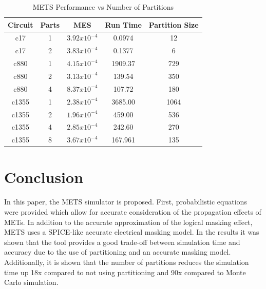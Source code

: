 \documentclass[conference]{IEEEtran}
\begin{document}
\begin{table}[ht]
	\begin{center}
		\caption{METS Performance vs Number of Partitions}
		\label{table:restable}
		\begin{tabular}{|c|c|c|c|c|}
			\hline
			Circuit& Parts & MES & Run Time & Partition Size\\ 
			\hline
			c17 & 1 & $3.92x10^{-4}$ & 0.0974 & 12\\
			\hline
			c17 & 2 & $3.83x10^{-4}$ & 0.1377 & 6\\
			\hline
			c880 & 1 & $4.15x10^{-4}$ & 1909.37 & 729\\
			\hline
			c880 & 2 & $3.13x10^{-4}$ & 139.54 & 350\\
			\hline
			c880 & 4 & $8.37x10^{-4}$ & 107.72 & 180\\
			\hline
			c1355 & 1 & $2.38x10^{-4}$ & 3685.00 & 1064\\
			\hline
			c1355 & 2 & $1.96x10^{-4}$ & 459.00 & 536\\
			\hline
			c1355 & 4 & $2.85x10^{-4}$ & 242.60 & 270\\
			\hline
			c1355 & 8 & $3.67x10^{-4}$ & 167.961 & 135\\
			\hline
		\end{tabular}
	\end{center}
\end{table}

\section{Conclusion} \label{conc}

In this paper, the METS simulator is proposed. First, probabilistic equations were provided which allow for accurate consideration of the propagation effects of METs. In addition to the accurate approximation of the logical masking effect, METS uses a SPICE-like accurate electrical masking model. In the results it was shown that the tool provides a good trade-off between simulation time and accuracy due to the use of partitioning and an accurate masking model. Additionally, it is shown that the number of partitions reduces the simulation time up 18x compared to not using partitioning and 90x compared to Monte Carlo simulation.




\end{document}
